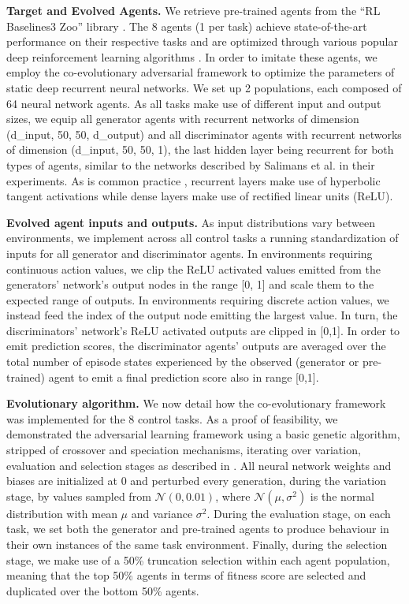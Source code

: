 \documentclass[dvipsnames,format=sigconf,anonymous=false,review=false]{acmart}
\begin{document}
\textbf{Target and Evolved Agents.} We retrieve pre-trained agents from the “RL Baselines3 Zoo'' library \cite{rl-zoo}. The 8 agents (1 per task) achieve state-of-the-art performance on their respective tasks and are optimized through various popular deep reinforcement learning algorithms \cite{mnih2013playing,schulman2017proximal,haarnoja2018soft,fujimoto2018addressing,kuznetsov2020controlling}. In order to imitate these agents, we employ the co-evolutionary adversarial framework to optimize the parameters of static deep recurrent neural networks. We set up 2 populations, each composed of 64 neural network agents. As all tasks make use of different input and output sizes, we equip all generator agents with recurrent networks of dimension (d\_input, 50, 50, d\_output) and all discriminator agents with recurrent networks of dimension (d\_input, 50, 50, 1),  the last hidden layer being recurrent for both types of agents, similar to the networks described by Salimans et al. \cite{salimans2017evolution} in their experiments. As is common practice \cite{goodfellow2016deep}, recurrent layers make use of hyperbolic tangent activations while dense layers make use of rectified linear units (ReLU). 

\textbf{Evolved agent inputs and outputs.} As input distributions vary between environments, we implement across all control tasks a running standardization of inputs for all generator and discriminator agents. In environments requiring continuous action values, we clip the ReLU activated values emitted from the generators’ network’s output nodes in the range [0, 1] and scale them to the expected range of outputs. In environments requiring discrete action values, we instead feed the index of the output node emitting the largest value. In turn, the discriminators' network’s ReLU activated outputs are clipped in [0,1]. In order to emit prediction scores, the discriminator agents’ outputs are averaged over the total number of episode states experienced by the observed (generator or pre-trained) agent to emit a final prediction score also in range [0,1].

\textbf{Evolutionary algorithm.} We now detail how the co-evolutionary framework was implemented for the 8 control tasks. As a proof of feasibility, we demonstrated the adversarial learning framework using  a basic genetic algorithm, stripped of crossover and speciation mechanisms, iterating over variation, evaluation and selection stages as described in \cite{such2017deep}. All neural network weights and biases are initialized at 0 and perturbed every generation, during the variation stage, by values sampled from $\mathcal{N}(0,0.01)$, where $\mathcal{N}(\mu,\sigma^{2})$ is the normal distribution with mean $\mu$ and variance $\sigma^{2}$. During the evaluation stage, on each task, we set both the generator and pre-trained agents to produce behaviour in their own instances of the same task environment. Finally, during the selection stage, we make use of a 50\% truncation selection within each agent population, meaning that the top 50\% agents in terms of fitness score are selected and duplicated over the bottom 50\% agents.
\end{document}

